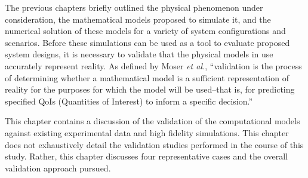 
\label{sec:validation}

%
%
%

%
%

The previous chapters briefly outlined the physical phenomenon under
consideration, the mathematical models proposed to simulate it,
and the numerical solution of these models for a variety of system 
configurations and scenarios. Before these simulations can be used 
as a tool to evaluate proposed system designs, it is necessary to
validate that the physical models in use accurately represent
reality. As defined by Moser {\em et al.}\cite{Moser2012Validating},
``validation is the process of determining whether a mathematical model
is a sufficient representation of reality for the purposes for which the
model will be used--that is, for predicting specified QoIs (Quantities
of Interest) to inform a specific decision.'' 

This chapter contains a discussion of the validation of the
computational models against existing experimental data and high
fidelity simulations. This chapter does not exhaustively detail the
validation studies performed in the course of this study. Rather, this
chapter discusses four representative cases and the overall validation
approach pursued. 

